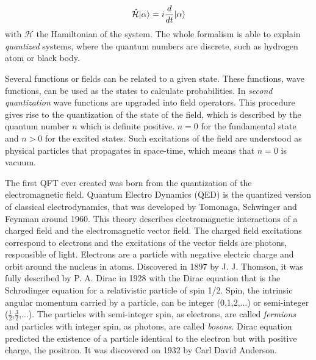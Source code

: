 \begin{equation}
  \label{eq:Schrodinger}
  \hat{\mathcal{H}}| \alpha\rangle=i\frac{d}{dt}| \alpha\rangle
\end{equation}with $\mathcal{H}$ the Hamiltonian of the system. The whole formalism is able to explain \textit{quantized} systems, where the quantum numbers are discrete, such as hydrogen atom or black body.

Several functions or fields can be related to a given state. These functions, wave functions, can be used as the states to calculate probabilities. In \textit{second quantization} wave functions are upgraded into field operators. This procedure gives rise to the quantization of the state of the field, which is described by the quantum number $n$ which is definite positive. $n=0$ for the fundamental state and $n>0$ for the excited states. Such excitations of the field are understood as physical particles that propagates in space-time, which means that $n=0$ is vacuum. 

The first QFT ever created was born from the quantization of the electromagnetic field. Quantum Electro Dynamics (QED) is the quantized version of classical electrodynamics, that was developed by Tomonaga, Schwinger and Feynman around 1960. This theory describes electromagnetic interactions of a charged field and the electromagnetic vector field. The charged field excitations correspond to electrons and the excitations of the vector fields are photons, responsible of light. Electrons are a particle with negative electric charge and orbit around the nucleus in atoms. Discovered in 1897 by J. J. Thomson, it was fully described by P. A. Dirac in 1928 with the Dirac equation that is the Schrodinger equation for a relativistic particle of spin 1/2. Spin, the intrinsic angular momentum carried by a particle, can be integer (0,1,2,...) or semi-integer ($\frac{1}{2}$,$\frac{3}{2}$,...). The particles with semi-integer spin, as electrons, are called \textit{fermions} and particles with integer spin, as photons, are called \textit{bosons}. Dirac equation predicted the existence of a particle identical to the electron but with positive charge, the positron. It was discovered on 1932 by Carl David Anderson.

